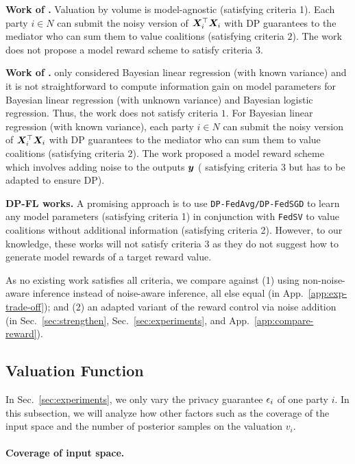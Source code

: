 \documentclass{article}
\theoremstyle{plain}
\theoremstyle{definition}
\theoremstyle{remark}
\renewcommand{\citet}[1]{\cite{#1}}
\begin{document}
\textbf{Work of \citet{xu2021vol}.} Valuation by volume is model-agnostic (satisfying criteria 1). Each party $i \in N$ can submit the noisy version of ${\bm{X}}_i^\top {\bm{X}}_i$  with DP guarantees to the mediator who can sum them to value coalitions (satisfying criteria $2$).
The work does not propose a model reward scheme to satisfy criteria $3$. 


\textbf{Work of \citet{simcollaborative}.} \cite{simcollaborative} only considered Bayesian linear regression (with known variance) and it is not straightforward to compute information gain on model parameters for Bayesian linear regression (with unknown variance) and Bayesian logistic regression. Thus, the work does not satisfy criteria $1$. For Bayesian linear regression (with known variance), each party $i \in N$ can submit the noisy version of ${\bm{X}}_i^\top {\bm{X}}_i$ with DP guarantees to the mediator who can sum them to value coalitions (satisfying criteria $2$).
The work proposed a model reward scheme which involves adding noise to the outputs ${\bm{y}}$ ( satisfying criteria 3 but has to be adapted to ensure DP). 

\textbf{DP-FL works.} A promising approach is to use \texttt{DP-FedAvg/DP-FedSGD} \cite{mcmahan2017learning} to learn any model parameters (satisfying criteria 1) in conjunction with \texttt{FedSV} \cite{wang2020fedval} to value coalitions without additional information (satisfying criteria 2). However, to our knowledge, these works will not satisfy criteria 3 as they do not suggest how to  generate model rewards of a target reward value.

As no existing work satisfies all criteria, we compare against (1) using non-noise-aware inference instead of noise-aware inference, all else equal (in App.~\ref{app:exp-trade-off}); and (2) an adapted variant of the reward control via noise addition (in Sec.~\ref{sec:strengthen},  Sec.~\ref{sec:experiments}, and App.~\ref{app:compare-reward}).


\subsection{Valuation Function}\label{app:exp-valuation}

In Sec.~\ref{sec:experiments}, we only vary the privacy guarantee ${\epsilon}_i$ of one party $i$. In this subsection, we will analyze how other factors such as the coverage of the input space and the number of posterior samples on the valuation ${v}_i$.

\paragraph{Coverage of input space.}
\end{document}
